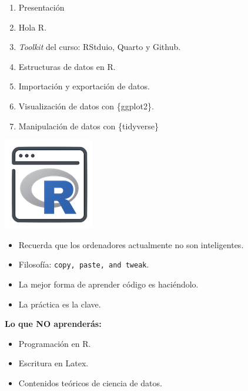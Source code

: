 \documentclass[
  letterpaper,
  DIV=11,
  numbers=noendperiod]{scrartcl}
\providecommand{\tightlist}{%
  \setlength{\itemsep}{0pt}\setlength{\parskip}{0pt}}\usepackage{longtable,booktabs,array}
\begin{document}
\begin{enumerate}
\def\labelenumi{\arabic{enumi}.}
\setcounter{enumi}{-1}
\item
  Presentación
\item
  Hola R.
\item
  \emph{Toolkit} del curso: RStduio, Quarto y Github.
\item
  Estructuras de datos en R.
\item
  Importación y exportación de datos.
\item
  Visualización de datos con \{ggplot2\}.
\item
  Manipulación de datos con \{tidyverse\}
\end{enumerate}

\includegraphics{img/icons8-code-R-64.png}

\begin{tcolorbox}[enhanced jigsaw, left=2mm, bottomrule=.15mm, coltitle=black, opacitybacktitle=0.6, colbacktitle=quarto-callout-note-color!10!white, rightrule=.15mm, opacityback=0, leftrule=.75mm, arc=.35mm, colback=white, colframe=quarto-callout-note-color-frame, breakable, titlerule=0mm, toptitle=1mm, bottomtitle=1mm, toprule=.15mm, title=\textcolor{quarto-callout-note-color}{\faInfo}\hspace{0.5em}{Nuestra filosofía: 📖 \emph{learning by doing}}]

\begin{itemize}
\item
  Recuerda que los ordenadores actualmente no son inteligentes.
\item
  Filosofía: \texttt{copy,\ paste,\ and\ tweak}.
\item
  La mejor forma de aprender código es haciéndolo.
\item
  La práctica es la clave.
\end{itemize}

\end{tcolorbox}

\textbf{Lo que NO aprenderás:}

\begin{itemize}
\tightlist
\item
  Programación en R.
\item
  Escritura en Latex.
\item
  Contenidos teóricos de ciencia de datos.
\end{itemize}
\end{document}

